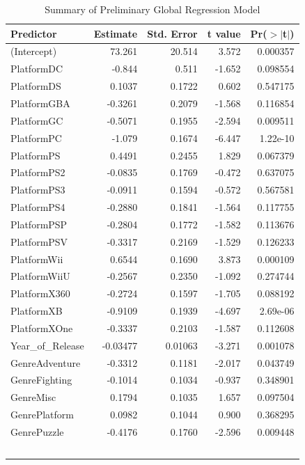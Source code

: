 \documentclass[12pt]{article}
\begin{document}
\begin{table}[ht]
  \caption{Summary of Preliminary Global Regression Model}
  \label{tab:global}
  \centering
  \small
  \begin{tabular}{lrrrr}
    \hline
    Predictor & Estimate & Std. Error & t value & Pr($>$$|$t$|$) \\ 
    \hline
    (Intercept) & 73.261 & 20.514 & 3.572 & 0.000357 \\
    PlatformDC & -0.844 & 0.511 & -1.652 & 0.098554 \\
    PlatformDS & 0.1037 & 0.1722 & 0.602 & 0.547175 \\
    PlatformGBA & -0.3261 & 0.2079 & -1.568 & 0.116854 \\
    PlatformGC & -0.5071 & 0.1955 & -2.594 & 0.009511 \\
    PlatformPC & -1.079 & 0.1674 & -6.447 & 1.22e-10 \\
    PlatformPS & 0.4491 & 0.2455 & 1.829 & 0.067379 \\
    PlatformPS2 & -0.0835 & 0.1769 & -0.472 & 0.637075 \\
    PlatformPS3 & -0.0911 & 0.1594 & -0.572 & 0.567581 \\
    PlatformPS4 & -0.2880 & 0.1841 & -1.564 & 0.117755 \\
    PlatformPSP & -0.2804 & 0.1772 & -1.582 & 0.113676 \\
    PlatformPSV & -0.3317 & 0.2169 & -1.529 & 0.126233 \\
    PlatformWii & 0.6544 & 0.1690 & 3.873 & 0.000109 \\
    PlatformWiiU & -0.2567 & 0.2350 & -1.092 & 0.274744 \\
    PlatformX360 & -0.2724 & 0.1597 & -1.705 & 0.088192 \\
    PlatformXB & -0.9109 & 0.1939 & -4.697 & 2.69e-06 \\
    PlatformXOne & -0.3337 & 0.2103 & -1.587 & 0.112608 \\
    Year\_of\_Release & -0.03477 & 0.01063 & -3.271 & 0.001078 \\
    GenreAdventure & -0.3312 & 0.1181 & -2.017 & 0.043749 \\
    GenreFighting & -0.1014 & 0.1034 & -0.937 & 0.348901 \\
    GenreMisc & 0.1794 & 0.1035 & 1.657 & 0.097504 \\
    GenrePlatform & 0.0982 & 0.1044 & 0.900 & 0.368295 \\
    GenrePuzzle & -0.4176 & 0.1760 & -2.596 & 0.009448 \\
$$
\end{tabular}
\end{table}
\end{document}
